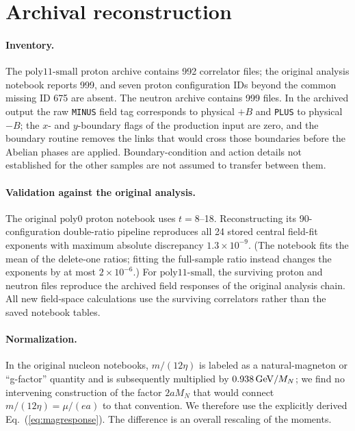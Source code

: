 \documentclass[aps,prd,reprint,twocolumn,superscriptaddress,nofootinbib,longbibliography]{revtex4-2}
\begin{document}
\appendix

\section{Archival reconstruction}
\label{app:archive}

\paragraph{Inventory.} The $\mathrm{poly11\mbox{-}small}$ proton archive contains 992 correlator files; the original analysis notebook reports 999, and seven proton configuration IDs beyond the common missing ID 675 are absent. The neutron archive contains 999 files. In the archived output the raw \texttt{MINUS} field tag corresponds to physical $+B$ and \texttt{PLUS} to physical $-B$; the $x$- and $y$-boundary flags of the production input are zero, and the boundary routine removes the links that would cross those boundaries before the Abelian phases are applied. Boundary-condition and action details not established for the other samples are not assumed to transfer between them.

\paragraph{Validation against the original analysis.} The original $\mathrm{poly0}$ proton notebook uses $t=8$--18. Reconstructing its 90-configuration double-ratio pipeline reproduces all 24 stored central field-fit exponents with maximum absolute discrepancy $1.3\times10^{-9}$. (The notebook fits the mean of the delete-one ratios; fitting the full-sample ratio instead changes the exponents by at most $2\times10^{-6}$.) For $\mathrm{poly11\mbox{-}small}$, the surviving proton and neutron files reproduce the archived field responses of the original analysis chain. All new field-space calculations use the surviving correlators rather than the saved notebook tables.

\paragraph{Normalization.} In the original nucleon notebooks, $m/(12\eta)$ is labeled as a natural-magneton or ``g-factor'' quantity and is subsequently multiplied by $0.938\,{\rm GeV}/M_N$; we find no intervening construction of the factor $2aM_N$ that would connect $m/(12\eta)=\mu/(ea)$ to that convention. We therefore use the explicitly derived Eq.~(\ref{eq:magresponse}). The difference is an overall rescaling of the moments.
\end{document}
